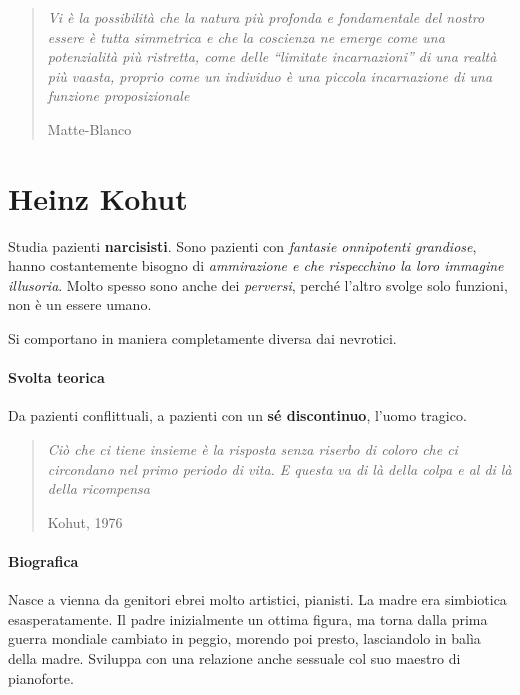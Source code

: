 \documentclass[12pt, a4paper]{article}
\begin{document}
\begin{quote}
    \emph{Vi è la possibilità che la natura più profonda e fondamentale del nostro essere è tutta simmetrica e che la coscienza ne emerge come una potenzialità più ristretta, come delle ``limitate incarnazioni'' di una realtà più vaasta, proprio come un individuo è una piccola incarnazione di una funzione proposizionale}
    \begin{flushright}
        Matte-Blanco
    \end{flushright}
\end{quote}


\section{Heinz Kohut}

Studia pazienti \textbf{narcisisti}. 
Sono pazienti con \emph{fantasie onnipotenti grandiose}, hanno costantemente bisogno di \emph{ammirazione e che rispecchino la loro immagine illusoria}. Molto spesso sono anche dei \emph{perversi}, perché l'altro svolge solo funzioni, non è un essere umano.

Si comportano in maniera completamente diversa dai nevrotici. 

\paragraph{Svolta teorica}  Da pazienti conflittuali, a pazienti con un \textbf{sé discontinuo}, l'uomo tragico.

\begin{quote}
    \emph{Ciò che ci tiene insieme è la risposta senza riserbo di coloro che ci circondano nel primo periodo di vita. E questa va di là della colpa e al di là della ricompensa}
    \begin{flushright}
        Kohut, 1976
    \end{flushright}
\end{quote}

\paragraph{Biografica}  Nasce a vienna da genitori ebrei molto artistici, pianisti. La madre era simbiotica esasperatamente. Il padre inizialmente un ottima fi\-gu\-ra, ma torna dalla prima guerra mondiale cambiato in peggio, morendo poi presto, lasciandolo in balìa della madre. Sviluppa con una relazione anche sessuale col suo maestro di pianoforte.
\end{document}

